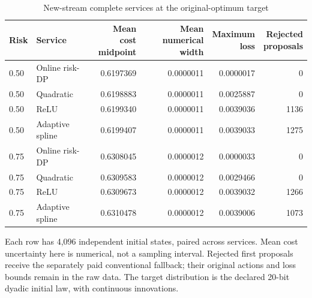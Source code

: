 \begin{table}[htbp]
\caption{New-stream complete services at the original-optimum target}\label{tab:services96}
\centering\small
\begin{tabular}{l l r r r r}\toprule
Risk & Service & \shortstack{Mean cost\\midpoint} & \shortstack{Mean numerical\\width} & \shortstack{Maximum\\loss} & \shortstack{Rejected\\proposals}\\
\midrule
0.50 & Online risk-DP & 0.6197369 & 0.0000011 & 0.0000017 & 0 \\
0.50 & Quadratic & 0.6198883 & 0.0000011 & 0.0025887 & 0 \\
0.50 & ReLU & 0.6199340 & 0.0000011 & 0.0039036 & 1136 \\
0.50 & Adaptive spline & 0.6199407 & 0.0000011 & 0.0039033 & 1275 \\
0.75 & Online risk-DP & 0.6308045 & 0.0000012 & 0.0000033 & 0 \\
0.75 & Quadratic & 0.6309583 & 0.0000012 & 0.0029466 & 0 \\
0.75 & ReLU & 0.6309673 & 0.0000012 & 0.0039032 & 1266 \\
0.75 & Adaptive spline & 0.6310478 & 0.0000012 & 0.0039006 & 1073 \\
\bottomrule\end{tabular}
\par\smallskip\parbox{.97\linewidth}{\footnotesize Each row has 4,096 independent initial states, paired across services. Mean cost uncertainty here is numerical, not a sampling interval. Rejected first proposals receive the separately paid conventional fallback; their original actions and loss bounds remain in the raw data. The target distribution is the declared 20-bit dyadic initial law, with continuous innovations.}
\end{table}
\begingroup\small\setlength{\tabcolsep}{3pt}
